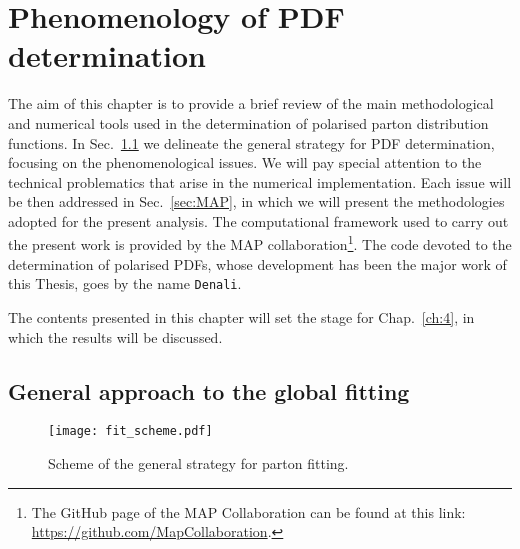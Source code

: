 \chapter{Phenomenology of PDF determination}
\label{ch:3}

The aim of this chapter is to provide a brief review of the main methodological and numerical tools used in the determination of polarised parton distribution functions. In Sec.~\ref{sec:gen_fit_str} we delineate the general strategy for PDF determination, focusing on the phenomenological issues. We will pay special attention to the technical problematics that arise in the numerical implementation. Each issue will be then addressed in Sec.~\ref{sec:MAP}, in which we will present the methodologies adopted for the present analysis. The computational framework used to carry out the present work is provided by the MAP collaboration\footnote{
  \footnotesize{The GitHub page of the MAP Collaboration can be found at this link: \href{https://github.com/MapCollaboration}{https://github.com/MapCollaboration}.}
}. The code devoted to the determination of polarised PDFs, whose development has been the major work of this Thesis, goes by the name \texttt{Denali}.\par
The contents presented in this chapter will set the stage for Chap.~\ref*{ch:4}, in which the results will be discussed.

\section{General approach to the global fitting}
\label{sec:gen_fit_str}

\begin{figure}[t]
  \centering
  \texttt{[image: fit\_scheme.pdf]} 
  \caption{Scheme of the general strategy for parton fitting.}
  \label{fig:fit_strategy}
\end{figure}

